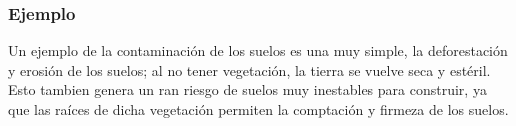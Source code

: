 \documentclass[stu, 12pt, letterpaper, donotrepeattitle, floatsintext, natbib]{apa7}
\begin{document}
\subsubsection{Ejemplo}
Un ejemplo de la contaminación de los suelos es una muy simple, la deforestación y erosión de los suelos; al no tener
vegetación, la tierra se vuelve seca y estéril. Esto tambien genera un ran riesgo de suelos muy inestables para construir, ya que las raíces
de dicha vegetación permiten la comptación y firmeza de los suelos.\par
\newpage
\setcounter{secnumdepth}{0} %
\renewcommand\refname{\textbf{Referencias}}
\end{document}
